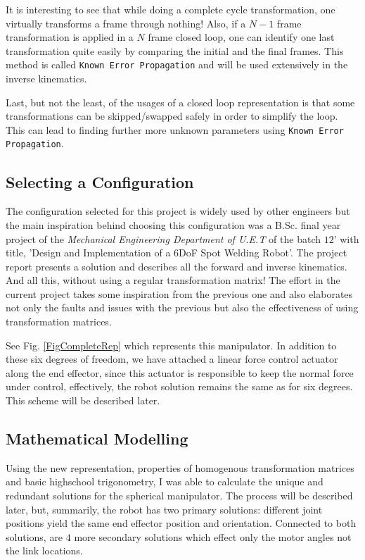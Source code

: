 {{        It is interesting to see that while doing a complete cycle transformation, one virtually transforms a frame through nothing! Also, if a $N-1$ frame transformation is applied in a $N$ frame closed loop, one can identify one last transformation quite easily by comparing the initial and the final frames. This method is called \texttt{Known Error Propagation} and will be used extensively in the inverse kinematics.

        Last, but not the least, of the usages of a closed loop representation is that some transformations can be skipped/swapped safely in order to simplify the loop. This can lead to finding further more unknown parameters using \texttt{Known Error Propagation}.

    }
    \subsection{Selecting a Configuration}
    {
        The configuration selected for this project is widely used by other engineers but the main inspiration behind choosing this configuration was a B.Sc. final year project of the \emph{Mechanical Engineering Department of U.E.T} of the batch $12$' with title, 'Design and Implementation of a $6$DoF Spot Welding Robot'. The project report presents a solution and describes all the forward and inverse kinematics. And all this, without using a regular transformation matrix! The effort in the current project takes some inspiration from the previous one and also elaborates not only the faults and issues with the previous but also the effectiveness of using transformation matrices.

        See Fig. \ref{FigCompleteRep} which represents this manipulator. In addition to these six degrees of freedom, we have attached a linear force control actuator along the end effector, since this actuator is responsible to keep the normal force under control, effectively, the robot solution remains the same as for six degrees. This scheme will be described later.
    }
    \subsection{Mathematical Modelling}
    {
        Using the new representation, properties of homogenous transformation matrices and basic highschool trigonometry,  I was able to calculate the unique and redundant solutions for the spherical manipulator. The process will be described later, but, summarily, the robot has two primary solutions: different joint positions yield the same end effector position and orientation. Connected to both solutions, are $4$ more secondary solutions which effect only the motor angles not the link locations.

}}
